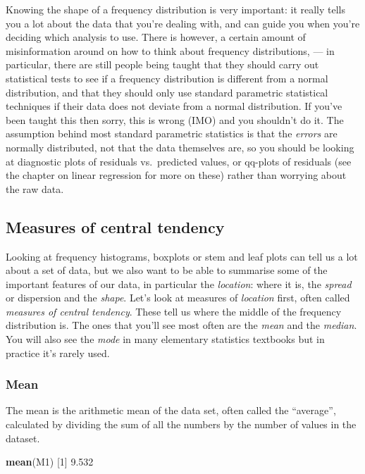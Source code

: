 \documentclass[
]{book}
\newenvironment{Shaded}{\begin{snugshade}}{\end{snugshade}}
\newcommand{\DecValTok}[1]{\textcolor[rgb]{0.00,0.00,0.81}{#1}}
\newcommand{\FloatTok}[1]{\textcolor[rgb]{0.00,0.00,0.81}{#1}}
\newcommand{\KeywordTok}[1]{\textcolor[rgb]{0.13,0.29,0.53}{\textbf{#1}}}
\newcommand{\NormalTok}[1]{#1}
\begin{document}
Knowing the shape of a frequency distribution is very important: it really tells you a lot about the data that you're dealing with, and can guide you when you're deciding which analysis to use. There is however, a certain amount of misinformation around on how to think about frequency distributions, --- in particular, there are still people being taught that they should carry out statistical tests to see if a frequency distribution is different from a normal distribution, and that they should only use standard parametric statistical techniques if their data does not deviate from a normal distribution. If you've been taught this then sorry, this is wrong (IMO) and you shouldn't do it. The assumption behind most standard parametric statistics is that the \emph{errors} are normally distributed, not that the data themselves are, so you should be looking at diagnostic plots of residuals vs.~predicted values, or qq-plots of residuals (see the chapter on linear regression for more on these) rather than worrying about the raw data.

\hypertarget{measures-of-central-tendency}{%
\subsection{Measures of central tendency}\label{measures-of-central-tendency}}

Looking at frequency histograms, boxplots or stem and leaf plots can tell us a lot about a set of data, but we also want to be able to summarise some of the important features of our data, in particular the \emph{location}: where it is, the \emph{spread} or dispersion and the \emph{shape}. Let's look at measures of \emph{location} first, often called \emph{measures of central tendency}. These tell us where the middle of the frequency distribution is. The ones that you'll see most often are the \emph{mean} and the \emph{median}. You will also see the \emph{mode} in many elementary statistics textbooks but in practice it's rarely used.

\hypertarget{mean}{%
\subsubsection{Mean}\label{mean}}

The mean is the arithmetic mean of the data set, often called the ``average'', calculated by dividing the sum of all the numbers by the number of values in the dataset.

\begin{Shaded}
\begin{Highlighting}[]
\KeywordTok{mean}\NormalTok{(M1)}
\NormalTok{[}\DecValTok{1}\NormalTok{] }\FloatTok{9.532}
\end{Highlighting}
\end{Shaded}
\end{document}
